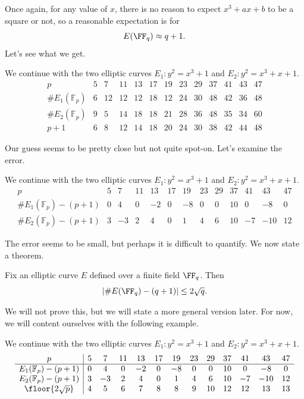 \documentclass{article}
\begin{document}
Once again, for any value of $x$, there is no reason to expect $x^3+ax+b$ to be a square or not, so a reasonable expectation is for
\[E(\FF_q)\approx q+1.\]
Let's see what we get.
\begin{example}
	We continue with the two elliptic curves $E_1\colon y^2=x^3+1$ and $E_2\colon y^2=x^3+x+1$.
	\[\begin{array}{c|ccccccccccccccccc}
		p & 5 & 7 & 11 & 13 & 17 & 19 & 23 & 29 & 37 & 41 & 43 & 47 \\\hline
		\#E_1(\mathbb F_p) & 6 & 12 & 12 & 12 & 18 & 12 & 24 & 30 & 48 & 42 & 36 & 48 \\
		\#E_2(\mathbb F_p) & 9 & 5 & 14 & 18 & 18 & 21 & 28 & 36 & 48 & 35 & 34 & 60 \\
		p+1 & 6 & 8 & 12 & 14 & 18 & 20 & 24 & 30 & 38 & 42 & 44 & 48
	\end{array}\]
\end{example}
Our guess seems to be pretty close but not quite spot-on. Let's examine the error.
\begin{example}
	We continue with the two elliptic curves $E_1\colon y^2=x^3+1$ and $E_2\colon y^2=x^3+x+1$.
	\[\begin{array}{c|ccccccccccccccccc}
		p & 5 & 7 & 11 & 13 & 17 & 19 & 23 & 29 & 37 & 41 & 43 & 47 \\\hline
		\#E_1(\mathbb F_p)-(p+1) & 0 & 4 & 0 & -2 & 0 & -8 & 0 & 0 & 10 & 0 & -8 & 0 \\
		\#E_2(\mathbb F_p)-(p+1) & 3 & -3 & 2 & 4 & 0 & 1 & 4 & 6 & 10 & -7 & -10 & 12
	\end{array}\]
\end{example}
The error seems to be small, but perhaps it is difficult to quantify. We now state a theorem.
\begin{theorem} \label{thm:hasse-weil}
	Fix an elliptic curve $E$ defined over a finite field $\FF_q$. Then
	\[\left|\#E(\FF_q)-(q+1)\right|\le2\sqrt q.\]
\end{theorem}
We will not prove this, but we will state a more general version later. For now, we will content ourselves with the following example.
\begin{example}
	We continue with the two elliptic curves $E_1\colon y^2=x^3+1$ and $E_2\colon y^2=x^3+x+1$.
	\[\begin{array}{c|ccccccccccccccccc}
		p & 5 & 7 & 11 & 13 & 17 & 19 & 23 & 29 & 37 & 41 & 43 & 47 \\\hline
		E_1(\mathbb F_p)-(p+1) & 0 & 4 & 0 & -2 & 0 & -8 & 0 & 0 & 10 & 0 & -8 & 0 \\
		E_2(\mathbb F_p)-(p+1) & 3 & -3 & 2 & 4 & 0 & 1 & 4 & 6 & 10 & -7 & -10 & 12 \\
		\floor{2\sqrt{p}} & 4 & 5 & 6 & 7 & 8 & 8 & 9 & 10 & 12 & 12 & 13 & 13
	\end{array}\]
\end{example}
\end{document}
